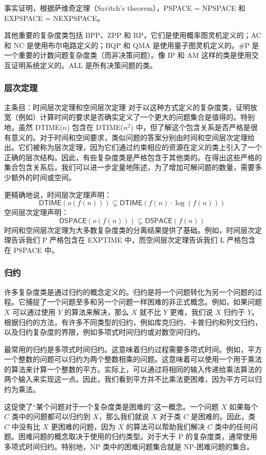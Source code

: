事实证明，根据萨维奇定理（Savitch's theorem），PSPACE = NPSPACE 和 EXPSPACE = NEXPSPACE。

其他重要的复杂度类包括 BPP、ZPP 和 RP，它们是使用概率图灵机定义的；AC 和 NC 是使用布尔电路定义的；BQP 和 QMA 是使用量子图灵机定义的。#P 是一个重要的计数问题复杂度类（而非决策问题）。像 IP 和 AM 这样的类是使用交互证明系统定义的。ALL 是所有决策问题的类。

\subsubsection{层次定理} 
主条目：时间层次定理和空间层次定理  
对于以这种方式定义的复杂度类，证明放宽（例如）计算时间的要求是否确实定义了一个更大的问题集合是值得的。特别地，虽然 DTIME(\( n \)) 包含在 DTIME(\( n^2 \)) 中，但了解这个包含关系是否严格是很有意义的。对于时间和空间要求，类似问题的答案分别由时间和空间层次定理给出。它们被称为层次定理，因为它们通过约束相应的资源在定义的类上引入了一个正确的层次结构。因此，有些复杂度类是严格包含于其他类的。在得出这些严格的集合包含关系后，我们可以进一步定量地陈述，为了增加可解问题的数量，需要多少额外的时间或空间。

更精确地说，时间层次定理声明：
\[
\mathsf{DTIME}(o(f(n))) \subsetneq \mathsf{DTIME}(f(n) \cdot \log(f(n)))~
\]
空间层次定理声明：
\[
\mathsf{DSPACE}(o(f(n))) \subsetneq \mathsf{DSPACE}(f(n))~
\]
时间和空间层次定理为大多数复杂度类的分离结果提供了基础。例如，时间层次定理告诉我们 P 严格包含在 EXPTIME 中，而空间层次定理告诉我们 L 严格包含在 PSPACE 中。

\subsubsection{归约} 
许多复杂度类是通过归约的概念定义的。归约是将一个问题转化为另一个问题的过程。它捕捉了一个问题至多和另一个问题一样困难的非正式概念。例如，如果问题 \( X \) 可以通过使用 \( Y \) 的算法来解决，那么 \( X \) 就不比 \( Y \) 更难，我们说 \( X \) 归约于 \( Y \)。根据归约的方法，有许多不同类型的归约，例如库克归约、卡普归约和列文归约，以及归约复杂度的界限，例如多项式时间归约或对数空间归约。

最常用的归约是多项式时间归约。这意味着归约过程需要多项式时间。例如，平方一个整数的问题可以归约为两个整数相乘的问题。这意味着可以使用一个用于乘法的算法来计算一个整数的平方。实际上，可以通过将相同的输入传递给乘法算法的两个输入来实现这一点。因此，我们看到平方并不比乘法更困难，因为平方可以归约为乘法。

这促使了“某个问题对于一个复杂度类是困难的”这一概念。一个问题 \( X \) 如果每个 \( C \) 类中的问题都可以归约到 \( X \)，那么我们就说 \( X \) 对于类 \( C \) 是困难的。因此，类 \( C \) 中没有比 \( X \) 更困难的问题，因为 \( X \) 的算法可以帮助我们解决 \( C \) 类中的任何问题。困难问题的概念取决于使用的归约类型。对于大于 P 的复杂度类，通常使用多项式时间归约。特别地，NP 类中的困难问题集合就是 NP-困难问题的集合。

